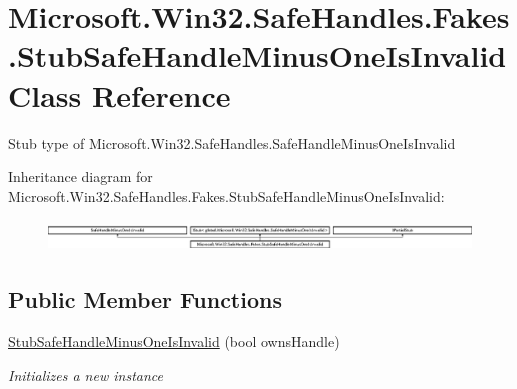 \hypertarget{class_microsoft_1_1_win32_1_1_safe_handles_1_1_fakes_1_1_stub_safe_handle_minus_one_is_invalid}{\section{Microsoft.\-Win32.\-Safe\-Handles.\-Fakes.\-Stub\-Safe\-Handle\-Minus\-One\-Is\-Invalid Class Reference}
\label{class_microsoft_1_1_win32_1_1_safe_handles_1_1_fakes_1_1_stub_safe_handle_minus_one_is_invalid}
}


Stub type of Microsoft.\-Win32.\-Safe\-Handles.\-Safe\-Handle\-Minus\-One\-Is\-Invalid 


Inheritance diagram for Microsoft.\-Win32.\-Safe\-Handles.\-Fakes.\-Stub\-Safe\-Handle\-Minus\-One\-Is\-Invalid\-:\begin{figure}[H]
\begin{center}
\leavevmode
\includegraphics[height=0.825959cm]{class_microsoft_1_1_win32_1_1_safe_handles_1_1_fakes_1_1_stub_safe_handle_minus_one_is_invalid}
\end{center}
\end{figure}
\subsection*{Public Member Functions}
\begin{DoxyCompactItemize}
\item 
\hyperlink{class_microsoft_1_1_win32_1_1_safe_handles_1_1_fakes_1_1_stub_safe_handle_minus_one_is_invalid_ae503f024064e354d40284a270d4b2769}{Stub\-Safe\-Handle\-Minus\-One\-Is\-Invalid} (bool owns\-Handle)
\begin{DoxyCompactList}\small\item\em Initializes a new instance\end{DoxyCompactList}\end{DoxyCompactItemize}
